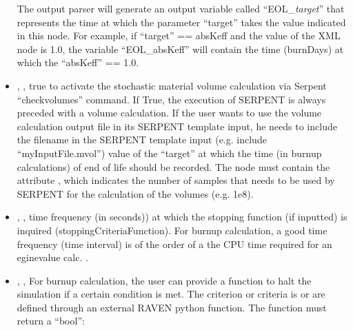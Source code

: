 \begin{itemize}
                                                              \nb  The output parser will generate an output variable called ``EOL\_\textit{target}'' that represents the time at which the 
                                                              parameter ``target'' takes the value indicated in this node. For example,  if ``target'' == absKeff and the value of the XML node is 1.0, 
                                                              the variable ``EOL\_absKeff'' will contain the time (burnDays) at which the ``absKeff'' == 1.0.
   \item {}, ,  true to activate the stochastic material volume calculation via Serpent ``checkvolumes'' command. If True, the execution of 
                                                             SERPENT is always preceded with a volume calculation. If the user wants to use the volume calculation output file in its SERPENT template input, he needs to include 
                                                             the filename in the SERPENT template input (e.g. include ``myInputFile.mvol'')  value of the ``target'' at which the time (in burnup calculations) of end of life should be recorded.
                                                             The   node  must contain the attribute , which indicates the number of samples that needs to be used by SERPENT for the calculation of the volumes (e.g. 1e8).
   \item {}, , time frequency (in seconds)) at which  the stopping function (if inputted)
                                                            is inquired (stoppingCriteriaFunction).
                                                            For burnup calculation, a good time frequency (time interval) is of the order of a the CPU time
                                                            required for an eginevalue calc. .
   \item {}, , For burnup calculation, the user can provide a
                                                            function to halt the simulation if a certain condition is
                                                            met. The criterion or criteria is or are defined through an external RAVEN python function. The function must return a ``bool'':
                                                            \begin{itemize}

\end{itemize}
\end{itemize}
